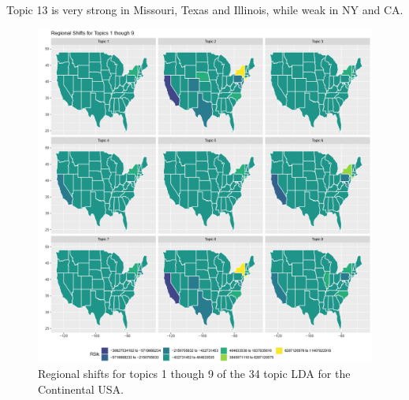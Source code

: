 Topic 13 is very strong in Missouri, Texas and Illinois, while weak in NY and CA.



\begin{figure}
	\centering
	\includegraphics[width=\linewidth]{Figures/ChapterV/States_01_09}
	\caption[Regional shifts using 34 Topic LDA, Topics 1 thought 9]{Regional shifts for topics 1 though 9 of the 34 topic LDA for the Continental USA.}
	\label{fig:shift-share_lda34-1-9}
\end{figure}

